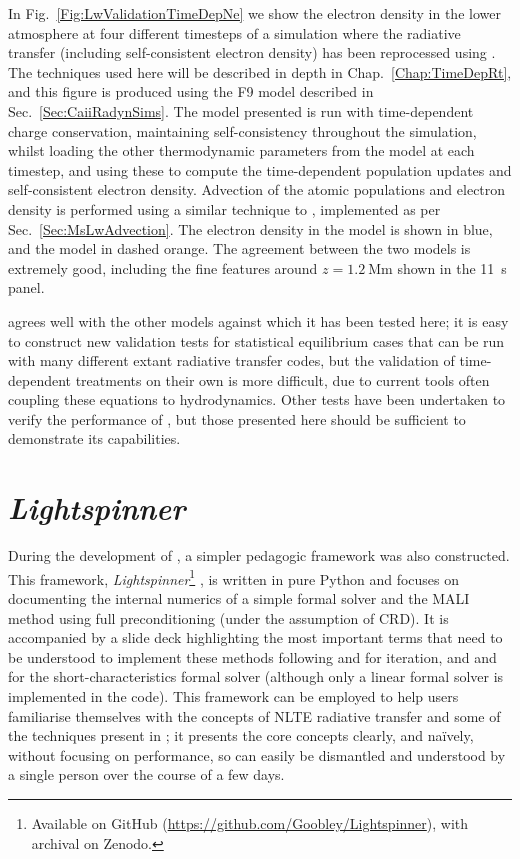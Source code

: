In Fig.~\ref{Fig:LwValidationTimeDepNe} we show the electron density in the lower atmosphere at four different timesteps of a \Radyn{} simulation where the radiative transfer (including self-consistent electron density) has been reprocessed using \Lw{}.
The techniques used here will be described in depth in Chap.~\ref{Chap:TimeDepRt}, and this figure is produced using the F9 model described in Sec.~\ref{Sec:CaiiRadynSims}.
The \Lw{} model presented is run with time-dependent charge conservation, maintaining self-consistency throughout the simulation, whilst loading the other thermodynamic parameters from the \Radyn{} model at each timestep, and using these to compute the time-dependent population updates and self-consistent electron density.
Advection of the atomic populations and electron density is performed using a similar technique to \Radyn{}, implemented as per Sec.~\ref{Sec:MsLwAdvection}.
The electron density in the \Radyn{} model is shown in blue, and the \Lw{} model in dashed orange.
The agreement between the two models is extremely good, including the fine features around $z=\SI{1.2}{\mega\metre}$ shown in the \SI{11}{\second} panel.

\Lw{} agrees well with the other models against which it has been tested here; it is easy to construct new validation tests for statistical equilibrium cases that can be run with many different extant radiative transfer codes, but the validation of time-dependent treatments on their own is more difficult, due to current tools often coupling these equations to hydrodynamics.
Other tests have been undertaken to verify the performance of \Lw{}, but those presented here should be sufficient to demonstrate its capabilities.


\section{\emph{Lightspinner}}

During the development of \Lw{}, a simpler pedagogic framework was also constructed.
This framework, \emph{Lightspinner}\footnote{Available on GitHub (\url{https://github.com/Goobley/Lightspinner}), with archival on Zenodo.} \citep{Lightspinner}, is written in pure Python and focuses on documenting the internal numerics of a simple formal solver and the MALI method using full preconditioning (under the assumption of CRD).
It is accompanied by a slide deck highlighting the most important terms that need to be understood to implement these methods following \citet{Rybicki1992} and \citet{Uitenbroek2001} for iteration, and \citet{Olson1987} and \citet{Auer1994} for the short-characteristics formal solver (although only a linear formal solver is implemented in the code). This framework can be employed to help users familiarise themselves with the concepts of NLTE radiative transfer and some of the techniques present in \Lw{}; it presents the core concepts clearly, and naïvely, without focusing on performance, so can easily be dismantled and understood by a single person over the course of a few days.

